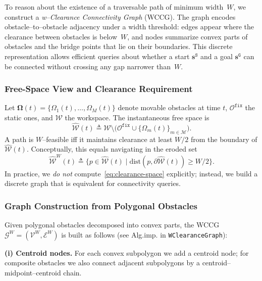 To reason about the existence of a traversable path of minimum width~$W$, we
construct a \emph{w–Clearance Connectivity Graph} (WCCG). The graph encodes
obstacle–to–obstacle adjacency under a width threshold: edges appear where the
clearance between obstacles is below~$W$, and nodes summarize convex parts of
obstacles and the bridge points that lie on their boundaries. This discrete
representation allows efficient queries about whether a start
$\mathbf{s}^{\texttt{S}}$ and a goal $\mathbf{s}^{\texttt{G}}$ can be
connected without crossing any gap narrower than~$W$.

\subsubsection{Free-Space View and Clearance Requirement}
\label{subsubsec:wccg-decomposition}
Let $\boldsymbol{\Omega}(t)=\{\Omega_1(t),\ldots,\Omega_M(t)\}$ denote movable
obstacles at time $t$, $\mathcal{O}^{\texttt{fix}}$ the static ones, and
$\mathcal{W}$ the workspace. The instantaneous free space is
\begin{equation}\label{eq:free-space}
  \widehat{\mathcal{W}}(t)
  \triangleq \mathcal{W}\setminus\!\big(\mathcal{O}^{\texttt{fix}}\cup\{\Omega_m(t)\}_{m\in\mathcal{M}}\big).
\end{equation}
A path is $W$–feasible iff it maintains clearance at least $W/2$ from the
boundary of $\widehat{\mathcal{W}}(t)$. Conceptually, this equals navigating
in the eroded set
\begin{equation}\label{eq:clearance-space}
  \widehat{\mathcal{W}}^{W}(t)
  \triangleq \{p\in\widehat{\mathcal{W}}(t)\mid \mathrm{dist}(p,\partial\widehat{\mathcal{W}}(t))\ge W/2\}.
\end{equation}
In practice, we \emph{do not} compute~\eqref{eq:clearance-space} explicitly;
instead, we build a discrete graph that is equivalent for connectivity queries.

\subsubsection{Graph Construction from Polygonal Obstacles}
\label{subsubsec:wccg-construction}
Given polygonal obstacles decomposed into convex parts, the WCCG
$\mathcal{G}^{W}=(\mathcal{V}^{W},\mathcal{E}^{W})$ is built as follows
(see Alg.\;imp. in \texttt{WClearanceGraph}):

\textbf{(i) Centroid nodes.} For each convex subpolygon we add a centroid
  node; for composite obstacles we also connect adjacent subpolygons by a
  centroid–midpoint–centroid chain.

